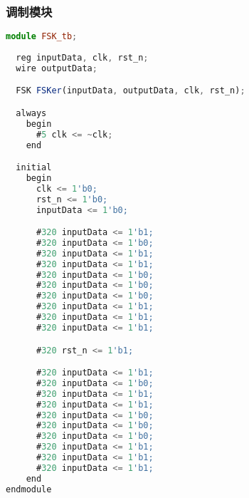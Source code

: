 \documentclass{progartcn}
\begin{document}
\subsubsection{调制模块}
\begin{lstlisting}[language=TypeScript,caption={FSK\_tb.v}]
module FSK_tb;
  
  reg inputData, clk, rst_n;
  wire outputData;

  FSK FSKer(inputData, outputData, clk, rst_n);

  always
    begin
      #5 clk <= ~clk;
    end

  initial
    begin
      clk <= 1'b0;
      rst_n <= 1'b0;
      inputData <= 1'b0;

      #320 inputData <= 1'b1;
      #320 inputData <= 1'b0;
      #320 inputData <= 1'b1;
      #320 inputData <= 1'b1;
      #320 inputData <= 1'b0;
      #320 inputData <= 1'b0;
      #320 inputData <= 1'b0;
      #320 inputData <= 1'b1;
      #320 inputData <= 1'b1;
      #320 inputData <= 1'b1;

      #320 rst_n <= 1'b1;

      #320 inputData <= 1'b1;
      #320 inputData <= 1'b0;
      #320 inputData <= 1'b1;
      #320 inputData <= 1'b1;
      #320 inputData <= 1'b0;
      #320 inputData <= 1'b0;
      #320 inputData <= 1'b0;
      #320 inputData <= 1'b1;
      #320 inputData <= 1'b1;
      #320 inputData <= 1'b1;
    end
endmodule
\end{lstlisting}
\end{document}
